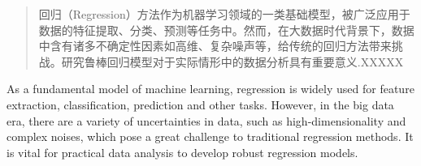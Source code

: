 \documentclass[master,oneside,winfonts]{njuthesis/njuthesis}
\author{朱子航}
\institute{南京大学}
\date{2023年5月13日}
\begin{document}

\maketitle
\makeenglishtitle


\begin{spacing}{1.25}
    \begin{abstract}
        回归（Regression）方法作为机器学习领域的一类基础模型，被广泛应用于数据的特征提取、分类、预测等任务中。然而，在大数据时代背景下，数据中含有诸多不确定性因素如高维、复杂噪声等，给传统的回归方法带来挑战。研究鲁棒回归模型对于实际情形中的数据分析具有重要意义.XXXXX


    \end{abstract}
\end{spacing}

\begin{spacing}{1.15}
    \begin{englishabstract}
        As a fundamental model of machine learning, regression is widely used for feature extraction, classification, prediction and other tasks. However, in the big data era, there are a variety of uncertainties in data, such as high-dimensionality and complex noises, which pose a great challenge to traditional regression methods. It is vital for practical data analysis to develop robust regression models.


    \end{englishabstract}
\end{spacing}

\begin{spacing}{1}
    \renewcommand*\contentsname{目录}
    \tableofcontents
\end{spacing}
\end{document}
